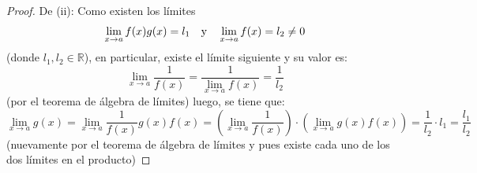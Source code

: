 \documentclass[12pt]{article}
\begin{document}
\begin{enumerate}
\begin{proof}
        De (ii): Como existen los límites
        \begin{equation*}
            \lim_{x\rightarrow a}f(x)g(x)=l_1\quad\textup{y}\quad\lim_{x\rightarrow a}f(x)=l_2\neq 0
        \end{equation*}
        (donde $l_1,l_2\in\mathbb{R}$), en particular, existe el límite siguiente y su valor es:
        \begin{equation*}
            \lim_{x\rightarrow a}\frac{1}{f(x)}=\frac{1}{\lim_{x\rightarrow a}f(x)}=\frac{1}{l_2}
        \end{equation*}
        (por el teorema de álgebra de límites) luego, se tiene que:
        \begin{equation*}
            \lim_{x\rightarrow a }g(x)=\lim_{x\rightarrow a }\frac{1}{f(x)}g(x)f(x)=\left(\lim_{x\rightarrow a }\frac{1}{f(x)}\right)\cdot\left(\lim_{x\rightarrow a }g(x)f(x)\right)=\frac{1}{l_2}\cdot l_1=\frac{l_1}{l_2}
        \end{equation*}
        (nuevamente por el teorema de álgebra de límites y pues existe cada uno de los dos límites en el producto)
    \end{proof}


\end{enumerate}
\end{document}
